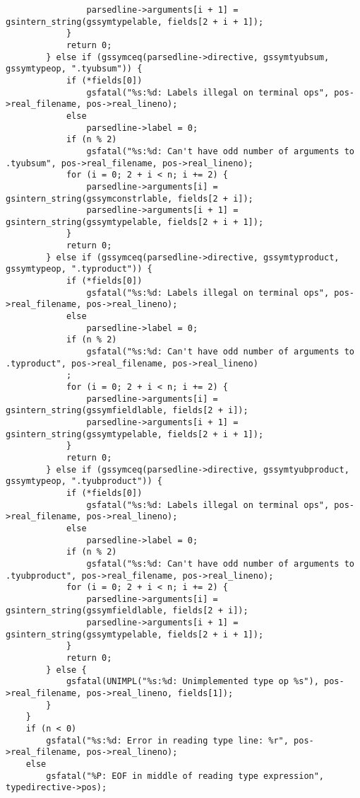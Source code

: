 \documentclass{report}
\begin{document}
\begin{verbatim}
                parsedline->arguments[i + 1] = gsintern_string(gssymtypelable, fields[2 + i + 1]);
            }
            return 0;
        } else if (gssymceq(parsedline->directive, gssymtyubsum, gssymtypeop, ".tyubsum")) {
            if (*fields[0])
                gsfatal("%s:%d: Labels illegal on terminal ops", pos->real_filename, pos->real_lineno);
            else
                parsedline->label = 0;
            if (n % 2)
                gsfatal("%s:%d: Can't have odd number of arguments to .tyubsum", pos->real_filename, pos->real_lineno);
            for (i = 0; 2 + i < n; i += 2) {
                parsedline->arguments[i] = gsintern_string(gssymconstrlable, fields[2 + i]);
                parsedline->arguments[i + 1] = gsintern_string(gssymtypelable, fields[2 + i + 1]);
            }
            return 0;
        } else if (gssymceq(parsedline->directive, gssymtyproduct, gssymtypeop, ".typroduct")) {
            if (*fields[0])
                gsfatal("%s:%d: Labels illegal on terminal ops", pos->real_filename, pos->real_lineno);
            else
                parsedline->label = 0;
            if (n % 2)
                gsfatal("%s:%d: Can't have odd number of arguments to .typroduct", pos->real_filename, pos->real_lineno)
            ;
            for (i = 0; 2 + i < n; i += 2) {
                parsedline->arguments[i] = gsintern_string(gssymfieldlable, fields[2 + i]);
                parsedline->arguments[i + 1] = gsintern_string(gssymtypelable, fields[2 + i + 1]);
            }
            return 0;
        } else if (gssymceq(parsedline->directive, gssymtyubproduct, gssymtypeop, ".tyubproduct")) {
            if (*fields[0])
                gsfatal("%s:%d: Labels illegal on terminal ops", pos->real_filename, pos->real_lineno);
            else
                parsedline->label = 0;
            if (n % 2)
                gsfatal("%s:%d: Can't have odd number of arguments to .tyubproduct", pos->real_filename, pos->real_lineno);
            for (i = 0; 2 + i < n; i += 2) {
                parsedline->arguments[i] = gsintern_string(gssymfieldlable, fields[2 + i]);
                parsedline->arguments[i + 1] = gsintern_string(gssymtypelable, fields[2 + i + 1]);
            }
            return 0;
        } else {
            gsfatal(UNIMPL("%s:%d: Unimplemented type op %s"), pos->real_filename, pos->real_lineno, fields[1]);
        }
    }
    if (n < 0)
        gsfatal("%s:%d: Error in reading type line: %r", pos->real_filename, pos->real_lineno);
    else
        gsfatal("%P: EOF in middle of reading type expression", typedirective->pos);


\end{verbatim}
\end{document}
